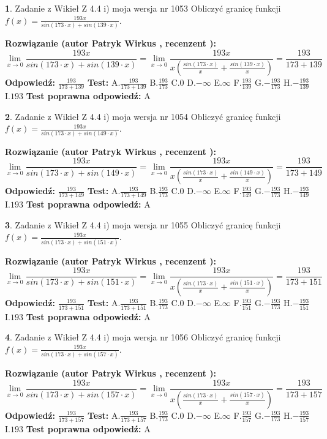 \documentclass[12pt, a4paper]{article}
\theoremstyle{definition} %
\newtheorem{zad}{}
\newcommand{\zadStart}[1]{\begin{zad}#1\newline}
\newcommand{\zadStop}{\end{zad}}
\newcommand{\rozwStart}[2]{\noindent \textbf{Rozwiązanie (autor #1 , recenzent #2): }\newline}
\newcommand{\rozwStop}{\newline}
\newcommand{\odpStart}{\noindent \textbf{Odpowiedź:}\newline}
\newcommand{\odpStop}{\newline}
\newcommand{\testStart}{\noindent \textbf{Test:}\newline}
\newcommand{\testStop}{\newline}
\newcommand{\kluczStart}{\noindent \textbf{Test poprawna odpowiedź:}\newline}
\newcommand{\kluczStop}{\newline}
\begin{document}
\zadStart{Zadanie z Wikieł Z 4.4 i) moja wersja nr 1053}
Obliczyć granicę funkcji $f(x)=\frac{193x}{sin(173\cdot x) +sin(139\cdot x)}$.
\zadStop
\rozwStart{Patryk Wirkus}{}
$$\lim\limits_{x\to 0}\frac{193x}{sin(173\cdot x) +sin(139\cdot x)}=\lim\limits_{x\to 0}\frac{193x}{x(\frac{sin(173\cdot x)}{x}+\frac{sin(139\cdot x)}{x})}=\frac{193}{173+139}$$
\rozwStop
\odpStart
$\frac{193}{173+139}$
\odpStop
\testStart
A.$\frac{193}{173+139}$
B.$\frac{193}{173}$
C.$0$
D.$-\infty$
E.$\infty$
F.$\frac{193}{139}$
G.$-\frac{193}{173}$
H.$-\frac{193}{139}$
I.$193$
\testStop
\kluczStart
A
\kluczStop



\zadStart{Zadanie z Wikieł Z 4.4 i) moja wersja nr 1054}
Obliczyć granicę funkcji $f(x)=\frac{193x}{sin(173\cdot x) +sin(149\cdot x)}$.
\zadStop
\rozwStart{Patryk Wirkus}{}
$$\lim\limits_{x\to 0}\frac{193x}{sin(173\cdot x) +sin(149\cdot x)}=\lim\limits_{x\to 0}\frac{193x}{x(\frac{sin(173\cdot x)}{x}+\frac{sin(149\cdot x)}{x})}=\frac{193}{173+149}$$
\rozwStop
\odpStart
$\frac{193}{173+149}$
\odpStop
\testStart
A.$\frac{193}{173+149}$
B.$\frac{193}{173}$
C.$0$
D.$-\infty$
E.$\infty$
F.$\frac{193}{149}$
G.$-\frac{193}{173}$
H.$-\frac{193}{149}$
I.$193$
\testStop
\kluczStart
A
\kluczStop



\zadStart{Zadanie z Wikieł Z 4.4 i) moja wersja nr 1055}
Obliczyć granicę funkcji $f(x)=\frac{193x}{sin(173\cdot x) +sin(151\cdot x)}$.
\zadStop
\rozwStart{Patryk Wirkus}{}
$$\lim\limits_{x\to 0}\frac{193x}{sin(173\cdot x) +sin(151\cdot x)}=\lim\limits_{x\to 0}\frac{193x}{x(\frac{sin(173\cdot x)}{x}+\frac{sin(151\cdot x)}{x})}=\frac{193}{173+151}$$
\rozwStop
\odpStart
$\frac{193}{173+151}$
\odpStop
\testStart
A.$\frac{193}{173+151}$
B.$\frac{193}{173}$
C.$0$
D.$-\infty$
E.$\infty$
F.$\frac{193}{151}$
G.$-\frac{193}{173}$
H.$-\frac{193}{151}$
I.$193$
\testStop
\kluczStart
A
\kluczStop



\zadStart{Zadanie z Wikieł Z 4.4 i) moja wersja nr 1056}
Obliczyć granicę funkcji $f(x)=\frac{193x}{sin(173\cdot x) +sin(157\cdot x)}$.
\zadStop
\rozwStart{Patryk Wirkus}{}
$$\lim\limits_{x\to 0}\frac{193x}{sin(173\cdot x) +sin(157\cdot x)}=\lim\limits_{x\to 0}\frac{193x}{x(\frac{sin(173\cdot x)}{x}+\frac{sin(157\cdot x)}{x})}=\frac{193}{173+157}$$
\rozwStop
\odpStart
$\frac{193}{173+157}$
\odpStop
\testStart
A.$\frac{193}{173+157}$
B.$\frac{193}{173}$
C.$0$
D.$-\infty$
E.$\infty$
F.$\frac{193}{157}$
G.$-\frac{193}{173}$
H.$-\frac{193}{157}$
I.$193$
\testStop
\kluczStart
A
\kluczStop
\end{document}
